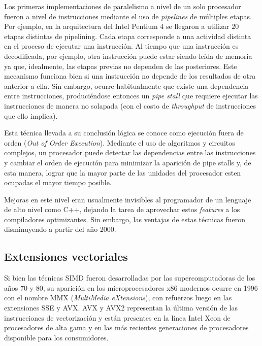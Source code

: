 Los primeras implementaciones de paralelismo a nivel de un solo procesador fueron a nivel de instrucciones mediante el uso de \textit{pipelines} de m\'ultiples etapas.
Por ejemplo, en la arquitectura del Intel Pentium 4 se llegaron a utilizar $20$ etapas distintas de pipelining.
Cada etapa corresponde a una actividad distinta en el proceso de ejecutar una instrucci\'on.
Al tiempo que una instrucci\'on es decodificada, por ejemplo, otra instrucci\'on puede estar siendo le\'ida de memoria ya que, idealmente, las etapas previas no dependen de las posteriores.
Este mecanismo funciona bien si una instrucci\'on no depende de los resultados de otra anterior a ella.
Sin embargo, ocurre habitualmente que existe una dependencia entre instrucciones, produci\'endose entonces un \textit{pipe stall} que requiere ejecutar las instrucciones de manera no solapada (con el costo de \textit{throughput} de instrucciones que ello implica).

Esta t\'ecnica llevada a su conclusi\'on l\'ogica se conoce como ejecuci\'on fuera de orden (\textit{Out of Order Execution}).
Mediante el uso de algoritmos y circuitos complejos, un procesador puede detectar las dependencias entre las instrucciones y cambiar el orden de ejecuci\'on para minimizar la aparici\'on de pipe stalls y, de esta manera, lograr que la mayor parte de las unidades del procesador esten ocupadas el mayor tiempo posible.

Mejoras en este nivel eran usualmente invisibles al programador de un lenguaje de alto nivel como C++, dejando la tarea de aprovechar estos \textit{features} a los compiladores optimizantes.
Sin embargo, las ventajas de estas t\'ecnicas fueron disminuyendo a partir del a\~no 2000.

\subsection{Extensiones vectoriales}

Si bien las t\'ecnicas SIMD fueron desarrolladas por las supercomputadoras de los a\~nos 70 y 80, su aparici\'on en los microprocesadores x86 modernos ocurre en 1996 con el nombre MMX (\textit{MultiMedia eXtensions}), con refuerzos luego en las extensiones SSE y AVX.
AVX y AVX2 representan la \'ultima versi\'on de las instrucciones de vectorizaci\'on y est\'an presentes en la l\'inea Intel Xeon de procesadores de alta gama y en las m\'as recientes generaciones de procesadores disponible para los consumidores.

